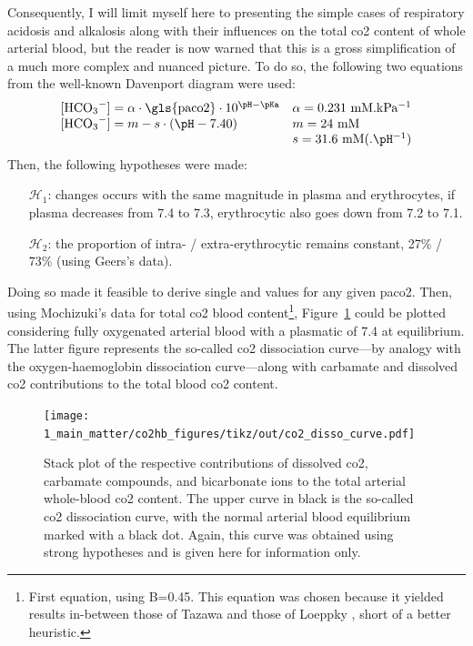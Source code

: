Consequently, I will limit myself here to presenting the simple cases of respiratory acidosis and alkalosis along with their influences on the total \gls{co2} content of whole arterial blood, but the reader is now warned that this is a gross simplification of a much more complex and nuanced picture. To do so, the following two equations from the well-known Davenport diagram were used\cite[Fig.~17]{davenport1974abc}:
\begin{equation}
	\begin{array}{ll}
		\ce{[HCO3^-]} = \alpha \cdot \text{\gls{paco2}}\cdot 10^{\pH - \pKa} & \alpha = \text{0.231~mM.kPa$^{-1}$}\\
		\ce{[HCO3^-]} = m - s \cdot (\pH - 7.40) & m = \text{24~mM}\\
		& s = \text{31.6~mM(.\pH$^{-1}$)}
	\end{array}
\end{equation}
Then, the following hypotheses were made:
\begin{itemize}
	\item[$\mathcal{H}_1$:] \pH{} changes occurs with the same magnitude in plasma and erythrocytes, \ie{} if plasma \pH{} decreases from 7.4 to 7.3, erythrocytic \pH{} also goes down from 7.2 to 7.1.
	\item[$\mathcal{H}_2$:] the proportion of intra- / extra-erythrocytic \ce{[HCO3^-]} remains constant, \ie{} 27\% / 73\% (using Geers's data\cite{geers2000}).
\end{itemize}
Doing so made it feasible to derive single \ce{[HCO3^-]} and \pH{} values for any given \gls{paco2}. Then, using Mochizuki's data for total \gls{co2} blood content\cite{mochizuki1982}\footnote{First equation, using B=0.45. This equation was chosen because it yielded results in-between those of Tazawa \etal{}\cite{tazawa1983} and those of Loeppky \etal{}\cite{loeppky1983}, short of a better heuristic.}, Figure~\ref{fig:co2hb:co2_dissociation_curve} could be plotted considering fully oxygenated arterial blood with a plasmatic \pH{} of 7.4 at equilibrium. The latter figure represents the so-called \gls{co2} dissociation curve---by analogy with the oxygen-haemoglobin dissociation curve---along with carbamate and dissolved \gls{co2} contributions to the total blood \gls{co2} content.

\begin{figure}
	\centering
	\texttt{[image: 1\_main\_matter/co2hb\_figures/tikz/out/co2\_disso\_curve.pdf]}
	\caption[\gls{co2} dissociation curve.]{Stack plot of the respective contributions of dissolved \gls{co2}, carbamate compounds, and bicarbonate ions to the total arterial whole-blood \gls{co2} content. The upper curve in black is the so-called \gls{co2} dissociation curve, with the normal arterial blood equilibrium marked with a black dot. Again, this curve was obtained using strong hypotheses and is given here for information only.}
	\label{fig:co2hb:co2_dissociation_curve}
\end{figure}

